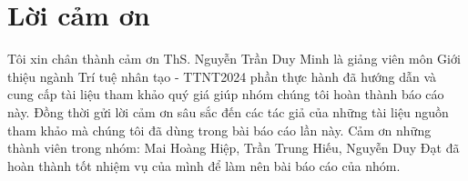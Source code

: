 \chapter*{Lời cảm ơn}
\label{thanks}

Tôi xin chân thành cảm ơn ThS. Nguyễn Trần Duy Minh là giảng viên môn Giới thiệu ngành Trí tuệ nhân tạo - TTNT2024 phần thực hành đã hướng dẫn và cung cấp tài liệu tham khảo quý giá giúp nhóm chúng tôi hoàn thành báo cáo này. Đồng thời gửi lời cảm ơn sâu sắc đến các tác giả của những tài liệu nguồn tham khảo mà chúng tôi đã dùng trong bài báo cáo lần này. Cảm ơn những thành viên trong nhóm: Mai Hoàng Hiệp, Trần Trung Hiếu, Nguyễn Duy Đạt đã hoàn thành tốt nhiệm vụ của mình để làm nên bài báo cáo của nhóm.